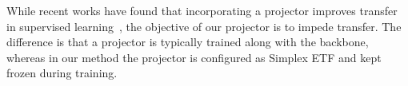 \begin{comment}
\textbf{\textit{Building collapsed features using fixed ETF projector.}}
Projector is widely used in self-supervised learning to prevent model collapse~\cite{zhu2023variance}. Recently, supervised learning has been shown to benefit from using a projector, particularly in retaining intra-class variation and mitigating feature redundancy~\cite{wang2022revisiting, sariyildiz2023no}. The projector comprises MLP layer(s) sandwiched between the encoder (backbone) and classifier head. It has also been demonstrated that top layers of DNN can be fixed as simplex-ETF without hurting the performance while accessing NC criteria. In this work, our goal is to build collapsed features in the projector which is different from the traditional goal of the projector. Instead of enhancing feature variability, we want to enhance feature collapse (intra-class variation becomes close to zero and ETF structure is formed). For this, we keep the entire projector frozen during training and set projector weights to simplex-ETFs, following earlier work~\cite{rangamani2023feature}.
In particular, each MLP layer is set to be a rank $H-1$ simplex ETFs, where $H$ denotes width or output feature dimension. 
The rank $K$ canonical simplex ETF is:
\[
\sqrt{\frac{K}{K-1}} (\mathbf{I}_K - \frac{1}{K} \mathbf{1}_K \mathbf{1}_K^T).
\]

\end{comment}

While recent works have found that incorporating a projector improves transfer in supervised learning~\cite{mialon2209variance}, the objective of our projector is to impede transfer. The difference is that a projector is typically trained along with the backbone, whereas in our method the projector is configured as Simplex ETF and kept frozen during training.




